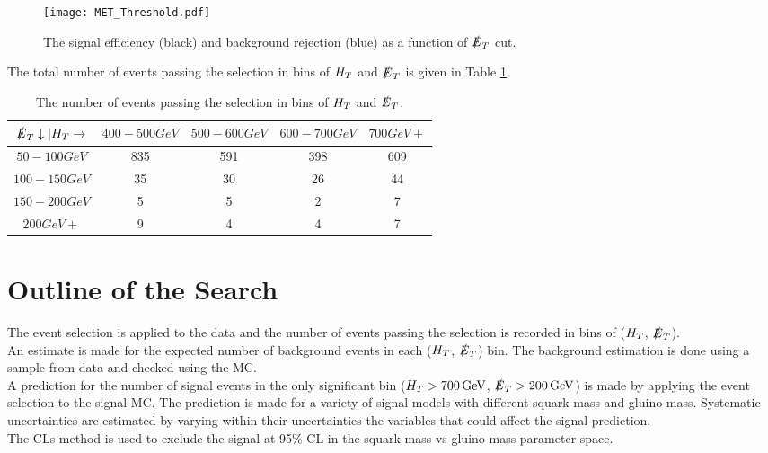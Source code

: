 \begin{figure}
\begin{center}
\texttt{[image: MET\_Threshold.pdf]}
\end{center}
\caption{The signal efficiency (black) and background rejection (blue) as a
function of $\slashed{E}_{T}$ cut.}
\label{fig:met_threshold}
\end{figure}

The total number of events passing the selection in bins of $H_{T}$ and $\slashed{E}_{T}$ is
given in Table \ref{tab:events}.

\begin{table}
\begin{center}
\begin{tabular}{|c|c|c|c|c|}
\hline
$\slashed{E}_{T}\downarrow | H_{T}\rightarrow$ & $400-500\unit{GeV}$ & $500-600\unit{GeV}$ 
& $600-700\unit{GeV}$ & $700\unit{GeV}+$ \\ 
\hline
$50-100\unit{GeV}$ & 835 & 591 & 398 & 609 \\
\hline
$100-150\unit{GeV}$ & 35 & 30 & 26 & 44 \\
\hline
$150-200\unit{GeV}$ & 5 & 5 & 2 & 7 \\
\hline
$200\unit{GeV}+$ & 9 & 4 & 4 & 7 \\
\hline
\end{tabular}
\end{center}
\caption{The number of events passing the selection in bins of $H_{T}$ and $\slashed{E}_{T}$.}
\label{tab:events}
\end{table}

\section{Outline of the Search}

The event selection is applied to the data and the number of events passing the
selection is recorded in bins of ($H_{T}$, $\slashed{E}_{T}$). \\

An estimate is made for the expected number of background events in each ($H_{T}$,
$\slashed{E}_{T}$) bin. The background estimation is done using a sample from data and
checked using the MC. \\

A prediction for the number of signal events in the only significant bin 
($H_{T}>700\, \mathrm{GeV}$, $\slashed{E}_{T}>200\, \mathrm{GeV}$) is made by applying the event
selection to the signal MC. The prediction is made for a variety of signal 
models with different squark mass and gluino mass. Systematic uncertainties are 
estimated by varying within their uncertainties the variables that could affect 
the signal prediction. \\

The CLs method is used to exclude the signal at 95\unit{\%} CL in the squark
mass vs gluino mass parameter space.

